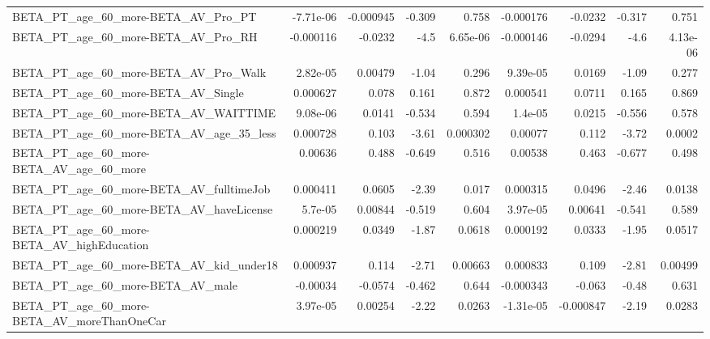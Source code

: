 \begin{tabular}{lrrrrrrrr}
BETA\_PT\_age\_60\_more-BETA\_AV\_Pro\_PT                 &   -7.71e-06 &    -0.000945 &    -0.309 &    0.758 &  -0.000176 &     -0.0232 &       -0.317 &         0.751 \\
BETA\_PT\_age\_60\_more-BETA\_AV\_Pro\_RH                 &   -0.000116 &      -0.0232 &      -4.5 & 6.65e-06 &  -0.000146 &     -0.0294 &         -4.6 &      4.13e-06 \\
BETA\_PT\_age\_60\_more-BETA\_AV\_Pro\_Walk               &    2.82e-05 &      0.00479 &     -1.04 &    0.296 &   9.39e-05 &      0.0169 &        -1.09 &         0.277 \\
BETA\_PT\_age\_60\_more-BETA\_AV\_Single                 &    0.000627 &        0.078 &     0.161 &    0.872 &   0.000541 &      0.0711 &        0.165 &         0.869 \\
BETA\_PT\_age\_60\_more-BETA\_AV\_WAITTIME               &    9.08e-06 &       0.0141 &    -0.534 &    0.594 &    1.4e-05 &      0.0215 &       -0.556 &         0.578 \\
BETA\_PT\_age\_60\_more-BETA\_AV\_age\_35\_less            &    0.000728 &        0.103 &     -3.61 & 0.000302 &    0.00077 &       0.112 &        -3.72 &        0.0002 \\
BETA\_PT\_age\_60\_more-BETA\_AV\_age\_60\_more            &     0.00636 &        0.488 &    -0.649 &    0.516 &    0.00538 &       0.463 &       -0.677 &         0.498 \\
BETA\_PT\_age\_60\_more-BETA\_AV\_fulltimeJob            &    0.000411 &       0.0605 &     -2.39 &    0.017 &   0.000315 &      0.0496 &        -2.46 &        0.0138 \\
BETA\_PT\_age\_60\_more-BETA\_AV\_haveLicense            &     5.7e-05 &      0.00844 &    -0.519 &    0.604 &   3.97e-05 &     0.00641 &       -0.541 &         0.589 \\
BETA\_PT\_age\_60\_more-BETA\_AV\_highEducation          &    0.000219 &       0.0349 &     -1.87 &   0.0618 &   0.000192 &      0.0333 &        -1.95 &        0.0517 \\
BETA\_PT\_age\_60\_more-BETA\_AV\_kid\_under18            &    0.000937 &        0.114 &     -2.71 &  0.00663 &   0.000833 &       0.109 &        -2.81 &       0.00499 \\
BETA\_PT\_age\_60\_more-BETA\_AV\_male                   &    -0.00034 &      -0.0574 &    -0.462 &    0.644 &  -0.000343 &      -0.063 &        -0.48 &         0.631 \\
BETA\_PT\_age\_60\_more-BETA\_AV\_moreThanOneCar         &    3.97e-05 &      0.00254 &     -2.22 &   0.0263 &  -1.31e-05 &   -0.000847 &        -2.19 &        0.0283 \\

\end{tabular}
